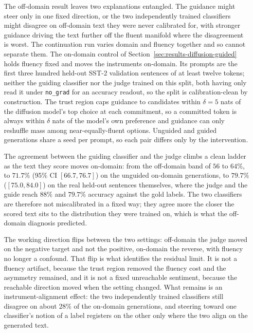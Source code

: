The off-domain result leaves two explanations entangled. The guidance might steer only in one
fixed direction, or the two independently trained classifiers might disagree on off-domain
text they were never calibrated for, with stronger guidance driving the text further off the
fluent manifold where the disagreement is worst. The continuation run varies domain and
fluency together and so cannot separate them. The on-domain control of
Section~\ref{sec:results-diffusion-guided} holds fluency fixed and moves the instruments
on-domain. Its prompts are the first three hundred held-out SST-2 validation sentences of at
least twelve tokens; neither the guiding classifier nor the judge trained on this split,
both having only read it under \texttt{no\_grad} for an accuracy readout, so the split is
calibration-clean by construction. The trust region caps guidance to candidates within
$\delta=5$ nats of the diffusion model's top choice at each commitment, so a committed token
is always within $\delta$ nats of the model's own preference and guidance can only reshuffle
mass among near-equally-fluent options. Unguided and guided generations share a seed per
prompt, so each pair differs only by the intervention.

The agreement between the guiding classifier and the judge climbs a clean ladder as the text
they score moves on-domain: from the off-domain band of $56$ to $64\%$, to $71.7\%$
(95\% CI $[66.7, 76.7]$) on the unguided on-domain generations, to $79.7\%$
($[75.0, 84.0]$) on the real held-out sentences themselves, where the judge and the guide
reach $88\%$ and $79.7\%$ accuracy against the gold labels.
The two classifiers are therefore not miscalibrated in a fixed way; they agree more the closer
the scored text sits to the distribution they were trained on, which is what the off-domain
diagnosis predicted.

The working direction flips between the two settings: off-domain the judge moved on the
negative target and not the positive, on-domain the reverse, with fluency no longer a
confound. That flip is what identifies the residual limit. It is not a fluency artifact,
because the trust region removed the fluency cost and the asymmetry remained, and it is not a
fixed unreachable sentiment, because the reachable direction moved when the setting changed.
What remains is an instrument-alignment effect: the two independently trained classifiers
still disagree on about $28\%$ of the on-domain generations, and steering toward one
classifier's notion of a label registers on the other only where the two align on the
generated text.


